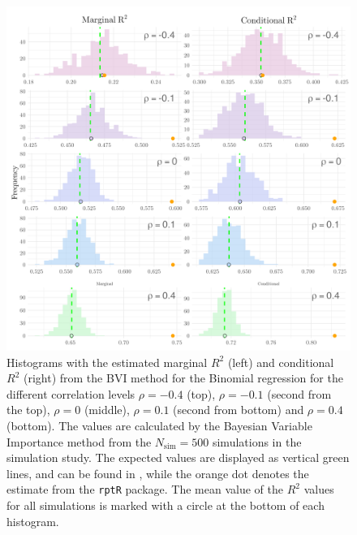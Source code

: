 \begin{figure}[H]
  \centering
  \includegraphics[width=1.1\linewidth]{Figures/Simulation study/R2_combined_poisson.png}
  \caption[Marginal and conditional $R^2$ in Poisson GLMM]{Histograms with the estimated marginal $R^2$ (left) and conditional $R^2$ (right) from the BVI method for the Binomial regression for the different correlation levels $\rho=-0.4$ (top), $\rho=-0.1$ (second from the top), $\rho=0$ (middle), $\rho=0.1$ (second from bottom) and $\rho=0.4$ (bottom). The values are calculated by the Bayesian Variable Importance method from the $N_{\text{sim}}=500$ simulations in the simulation study. The expected values are displayed as vertical green lines, and can be found in , while the orange dot denotes the estimate from the \texttt{rptR} package. The mean value of the $R^2$ values for all simulations is marked with a circle at the bottom of each histogram.}
  \label{fig:r2_combined_poisson}
\end{figure}




